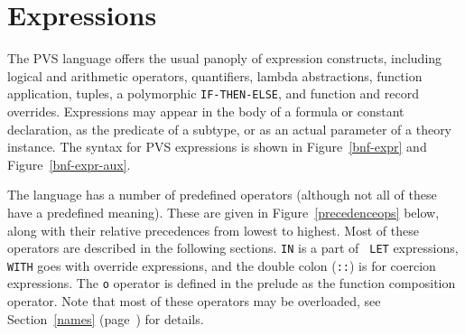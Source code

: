 
\chapter{Expressions}\label{expressions}

The PVS language offers the usual panoply of expression constructs,
including logical and arithmetic operators, quantifiers, lambda
abstractions, function application, tuples, a polymorphic
\texttt{IF-THEN-ELSE}, and function and record overrides.  Expressions may
appear in the body of a formula or constant declaration, as the predicate
of a subtype, or as an actual parameter of a theory instance.  The syntax
for PVS expressions is shown in Figure~\ref{bnf-expr} and
Figure~\ref{bnf-expr-aux}.



 The language has a number of predefined operators
(although not all of these have a predefined meaning).
These are given in Figure~\ref{precedenceops} below, along with their
relative precedences from lowest to highest.  Most of these operators
are described in the following sections.  \texttt{IN} is a part of \texttt{
LET} expressions, \texttt{WITH} goes with override expressions, and the
double colon
(\texttt{::}) is for coercion expressions.  The \texttt{o} operator is defined
in the prelude as the function composition operator.  Note that most of
these operators may be overloaded, see Section~\ref{names} (page~\pageref{names}) for details.

